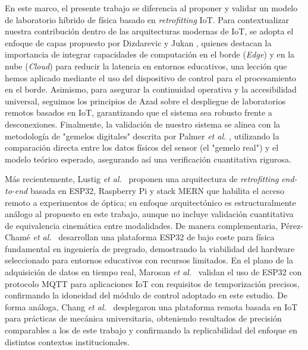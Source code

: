 \documentclass[journal,article,submit,pdftex]{Definitions/mdpi}
\begin{document}
En este marco, el presente trabajo se diferencia al proponer y validar un modelo de laboratorio híbrido de física basado en \textit{retrofitting} IoT. Para contextualizar nuestra contribución dentro de las arquitecturas modernas de IoT, se adopta el enfoque de capas propuesto por Dizdarevic y Jukan \cite{r7}, quienes destacan la importancia de integrar capacidades de computaci\'on en el borde (\textit{Edge}) y en la nube (\textit{Cloud}) para reducir la latencia en entornos educativos, una lecci\'on que hemos aplicado mediante el uso del dispositivo de control para el procesamiento en el borde. Asimismo, para asegurar la continuidad operativa y la accesibilidad universal, seguimos los principios de Azad \cite{r8} sobre el despliegue de laboratorios remotos basados en IoT, garantizando que el sistema sea robusto frente a desconexiones. Finalmente, la validaci\'on de nuestro sistema se alinea con la metodolog\'ia de "gemelos digitales" descrita por Palmer \textit{et al.} \cite{r9}, utilizando la comparaci\'on directa entre los datos f\'isicos del sensor (el "gemelo real") y el modelo te\'orico esperado, asegurando as\'i una verificaci\'on cuantitativa rigurosa.

M\'as recientemente, Lustig \textit{et al.}~\cite{r10} proponen una arquitectura de \textit{retrofitting} \textit{end-to-end} basada en ESP32, Raspberry Pi y stack MERN que habilita el acceso remoto a experimentos de \'optica; su enfoque arquitect\'onico es estructuralmente an\'alogo al propuesto en este trabajo, aunque no incluye validaci\'on cuantitativa de equivalencia cinem\'atica entre modalidades. De manera complementaria, P\'erez-Cham\'e \textit{et al.}~\cite{r11} desarrollan una plataforma ESP32 de bajo coste para f\'isica fundamental en ingenier\'ia de pregrado, demostrando la viabilidad del hardware seleccionado para entornos educativos con recursos limitados. En el plano de la adquisici\'on de datos en tiempo real, Marosan \textit{et al.}~\cite{r12} validan el uso de ESP32 con protocolo MQTT para aplicaciones IoT con requisitos de temporizaci\'on precisos, confirmando la idoneidad del m\'odulo de control adoptado en este estudio. De forma an\'aloga, Chang \textit{et al.}~\cite{r52} desplegaron una plataforma remota basada en IoT para pr\'acticas de mec\'anica universitaria, obteniendo resultados de precisi\'on comparables a los de este trabajo y confirmando la replicabilidad del enfoque en distintos contextos institucionales.
\end{document}
